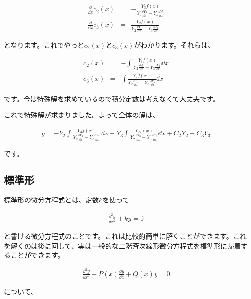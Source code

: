 \begin{eqnarray}
    \frac{\dd}{\dd x}c_2(x)&=&-\frac{Y_3f(x)}{Y_2\frac{\dd Y_3}{\dd x}-Y_3\frac{\dd Y_2}{\dd x}} \\
    \frac{\dd}{\dd x}c_3(x)&=&\frac{Y_2f(x)}{Y_2\frac{\dd Y_3}{\dd x}-Y_3\frac{\dd Y_2}{\dd x}}
\end{eqnarray}

\noindent
となります。これでやっと$c_2(x)$と$c_3(x)$がわかります。それらは、

\begin{eqnarray}
    c_2(x)&=&-\int\frac{Y_3f(x)}{Y_2\frac{\dd Y_3}{\dd x}-Y_3\frac{\dd Y_2}{\dd x}}\dd x \\
    c_3(x)&=&\int\frac{Y_2f(x)}{Y_2\frac{\dd Y_3}{\dd x}-Y_3\frac{\dd Y_2}{\dd x}}\dd x
\end{eqnarray}

\noindent
です。今は特殊解を求めているので積分定数は考えなくて大丈夫です。

これで特殊解が求まりました。よって全体の解は、

\begin{eqnarray}
    y=-Y_2\int\frac{Y_3f(x)}{Y_2\frac{\dd Y_3}{\dd x}-Y_3\frac{\dd Y_2}{\dd x}}\dd x+Y_3\int\frac{Y_2f(x)}{Y_2\frac{\dd Y_3}{\dd x}-Y_3\frac{\dd Y_2}{\dd x}}\dd x+C_2Y_2+C_3Y_3
\end{eqnarray}

\noindent
です。








\subsection{標準形}
\label{basic}
標準形の微分方程式とは、定数$k$を使って

\begin{eqnarray}
    \frac{\dd^2y}{\dd x^2}+ky=0
    \label{eq:basic}
\end{eqnarray}

\noindent
と書ける微分方程式のことです。これは比較的簡単に解くことができます。これを解くのは後に回して、実は一般的な二階斉次線形微分方程式を標準形に帰着することができます。

\begin{eqnarray}
    \frac{\dd^2 y}{\dd x^2}+P(x)\frac{\dd y}{\dd x}+Q(x)y=0
    \label{eq:second-order-normal}
\end{eqnarray}

\noindent
について、

